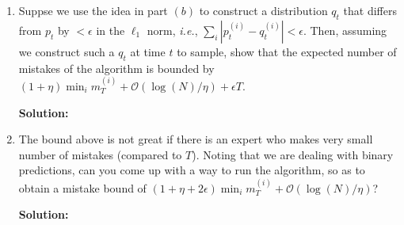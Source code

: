 \documentclass[12pt]{article}
\newcommand{\abs}[1]{\left| #1 \right|}
\newcommand{\BigO}[1]{\mathcal{O}\left( #1 \right)}
\begin{document}
\begin{enumerate}
\begin{enumerate}
      {\bf Solution:}

\item Suppse we use the idea in part $(b)$ to construct a distribution $q_{t}$ that differs from $p_{t}$ by $< \epsilon$ in the $\ell_{1}$ norm, {\em i.e.}, $\sum_{i}\abs{p_{t}^{(i)} - q_{t}^{(i)}} < \epsilon$. Then, assuming we construct such a $q_{t}$ at time $t$ to sample, show that the expected number of mistakes of the algorithm is bounded by $(1 + \eta)\min_{i}m_{T}^{(i)} + \BigO{\log(N)/\eta} + \epsilon T$.

      {\bf Solution:}

\item The bound above is not great if there is an expert who makes very small number of mistakes (compared to $T$). Noting that we are dealing with binary predictions, can you come up with a way to run the algorithm, so as to obtain a mistake bound of $\left( 1 + \eta + 2\epsilon\right)\min_{i}m_{T}^{(i)} + \BigO{\log(N)/\eta}$?

      {\bf Solution:}

\end{enumerate}
\end{enumerate}
 
\end{document}
